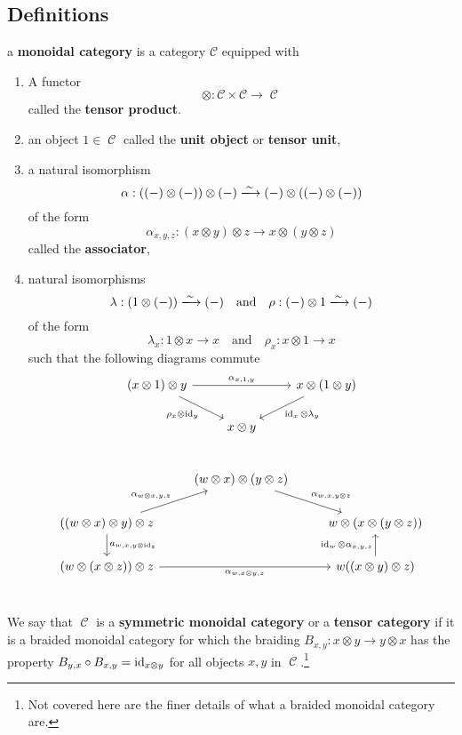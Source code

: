 \documentclass[11pt]{article}
\DeclareMathOperator{\CC}{\mathcal{C}}
\begin{document}
\subsection{Definitions}
\begin{defn}\label{monoidcat}
a \textbf{monoidal category} is a category $\mathcal{C}$ equipped with
\begin{enumerate}[1.]
\item A functor 
	\[
		\otimes: \mathcal{C} \times \mathcal{C} \to \CC
	\]called the \textbf{tensor product}.

\item an object $1 \in \CC$ called the \textbf{unit object} or \textbf{tensor unit},
\item a natural isomorphism 
\[
	\alpha: ((-)\otimes(-))\otimes(-) \xlongrightarrow{\sim} (-)\otimes((-)\otimes(-))
\]
of the form
\[
	\alpha_{x,y,z}: (x \otimes y) \otimes z \to x \otimes (y \otimes z)
\] 
called the \textbf{associator},
\item natural isomorphisms
\[
	\lambda: (1 \otimes (-)) \xlongrightarrow{\sim} (-) \quad \text{and} \quad \rho: (-) \otimes 1 \xlongrightarrow{\sim}(-)
\]
of the form 
\[
	\lambda_x: 1 \otimes x \to x \quad \text{and} \quad \rho_x: x \otimes 1 \to x
\]
such that the following diagrams commute
\[
\begin{tikzcd}
(x \otimes 1) \otimes y  \ar[dr,"\rho_x \otimes \id_y"']\ar[rr, "\alpha_{x,1,y}"] &   & x \otimes (1 \otimes y) \ar[ld, "\id_x \otimes \lambda_y"]\\
  & x \otimes y &  \\
\end{tikzcd}
\]
\[\begin{tikzcd}
  & (w \otimes x) \otimes (y \otimes z) \ar[rd, "\alpha_{w,x,y \otimes z}"] &  \\
	((w \otimes x) \otimes y) \otimes z \ar[ur, "\alpha_{w \otimes x, y ,z}"] \ar[d, "a_{w,x,y \otimes \id_z}"] &   & w \otimes (x \otimes (y \otimes z)) \\
	(w \otimes ( x \otimes z)) \otimes z \ar[rr, "\alpha_{w,x \otimes y, z}"']  &   & w((x \otimes y) \otimes z) \ar[u, "\id_w \otimes \alpha_{x,y,z}"]  \\
\end{tikzcd}\]
\end{enumerate}
We say that $\CC$ is a \textbf{symmetric monoidal category} or a \textbf{tensor category} if it is a braided monoidal category for which the braiding $B_{x,y}: x \otimes y \to y \otimes x$ has the property $B_{y,x}\circ B_{x,y} = \operatorname{id}_{x \otimes y}$ for all objects $x,y$ in $\CC$.\footnote{Not covered here are the finer details of what a braided monoidal category are.}
\end{defn}
\end{document}
